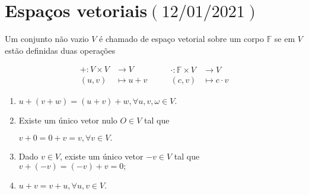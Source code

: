 \chapter{Espaços vetoriais\quad$\left(12/01/2021\right)$}

\begin{definition}
	Um conjunto não vazio $V$ é chamado de espaço vetorial sobre um
	corpo $\mathbb{F}$ se em $V$ estão definidas duas operações

	\[
		\begin{aligned}
			+\colon V\times V & \longrightarrow V \\
			\left(u,v\right)  & \longmapsto u+v
		\end{aligned}\qquad
		\begin{aligned}
			\cdot\colon\mathbb{F}\times V & \longrightarrow V    \\
			\left(c,v\right)              & \longmapsto c\cdot v
		\end{aligned}
	\]

	\begin{enumerate}[label={(A\arabic*)},leftmargin=0em,itemindent=*]
		\item\label{adição_vetores:1}

		      \begin{math}
			      u+
			      \left(v+w\right)=
			      \left(u+v\right)+
			      w,
			      \forall u,v,\omega\in V.
		      \end{math}

		\item\label{adição_vetores:2}

		      Existe um único vetor nulo $O\in V$ tal que

		      \begin{math}
			      v+0=
			      0+v=
			      v,
			      \forall v\in V.
		      \end{math}

		\item\label{adição_vetores:3}

		      Dado $v\in V$, existe um único vetor $-v\in V$ tal que
		      \begin{math}
			      v+\left(-v\right)=
			      \left(-v\right)+v=
			      0;
		      \end{math}

		\item\label{adição_vetores:4}

		      \begin{math}
			      u+v=
			      v+u,
			      \forall u,v\in V.
		      \end{math}
	\end{enumerate}


\end{definition}
